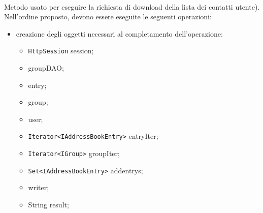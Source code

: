 \begin{description}
\item{}\\	
	Metodo usato per eseguire la richiesta di download della lista dei contatti utente). Nell'ordine proposto, devono essere eseguite le seguenti operazioni:
	\begin{itemize}
		\item creazione degli oggetti necessari al completamento dell'operazione:
		\begin{itemize}
			\item \texttt{HttpSession} session;
			\item {} groupDAO;
			\item {} entry;
			\item {} group;
			\item {} user;
			\item \texttt{Iterator<IAddressBookEntry>} entryIter;
			\item \texttt{Iterator<IGroup>} groupIter;
			\item \texttt{Set<IAddressBookEntry>} addentrys;
			\item {} writer;
			\item String result;
		\end{itemize}
		

\end{itemize}
\end{description}

